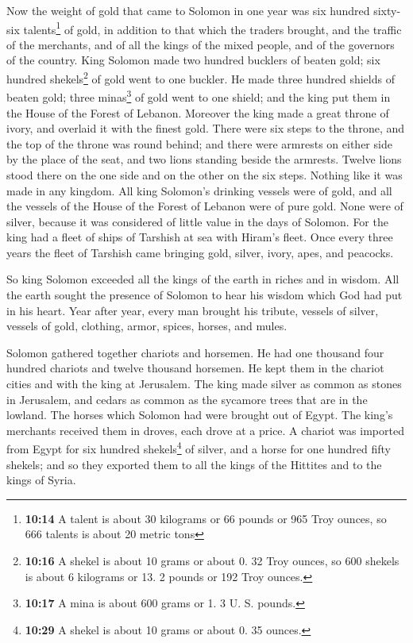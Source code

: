  Now the weight of gold that came to Solomon in one year
was six hundred sixty-six talents\footnote{\textbf{10:14} A talent is
  about 30 kilograms or 66 pounds or 965 Troy ounces, so 666 talents is
  about 20 metric tons} of gold,  in addition to that
which the traders brought, and the traffic of the merchants, and of all
the kings of the mixed people, and of the governors of the country.
 King Solomon made two hundred bucklers of beaten gold;
six hundred shekels\footnote{\textbf{10:16} A shekel is about 10 grams
  or about 0. 32 Troy ounces, so 600 shekels is about 6 kilograms or 13.
  2 pounds or 192 Troy ounces.} of gold went to one buckler.
 He made three hundred shields of beaten gold; three
minas\footnote{\textbf{10:17} A mina is about 600 grams or 1. 3 U. S.
  pounds.} of gold went to one shield; and the king put them in the
House of the Forest of Lebanon.  Moreover the king made a
great throne of ivory, and overlaid it with the finest gold.
 There were six steps to the throne, and the top of the
throne was round behind; and there were armrests on either side by the
place of the seat, and two lions standing beside the armrests.
 Twelve lions stood there on the one side and on the
other on the six steps. Nothing like it was made in any kingdom.
 All king Solomon's drinking vessels were of gold, and
all the vessels of the House of the Forest of Lebanon were of pure gold.
None were of silver, because it was considered of little value in the
days of Solomon.  For the king had a fleet of ships of
Tarshish at sea with Hiram's fleet. Once every three years the fleet of
Tarshish came bringing gold, silver, ivory, apes, and peacocks.

 So king Solomon exceeded all the kings of the earth in
riches and in wisdom.  All the earth sought the presence
of Solomon to hear his wisdom which God had put in his heart.
 Year after year, every man brought his tribute, vessels
of silver, vessels of gold, clothing, armor, spices, horses, and mules.

 Solomon gathered together chariots and horsemen. He had
one thousand four hundred chariots and twelve thousand horsemen. He kept
them in the chariot cities and with the king at Jerusalem.
 The king made silver as common as stones in Jerusalem,
and cedars as common as the sycamore trees that are in the lowland.
 The horses which Solomon had were brought out of Egypt.
The king's merchants received them in droves, each drove at a price.
 A chariot was imported from Egypt for six hundred
shekels\footnote{\textbf{10:29} A shekel is about 10 grams or about 0.
  35 ounces.} of silver, and a horse for one hundred fifty shekels; and
so they exported them to all the kings of the Hittites and to the kings
of Syria.

